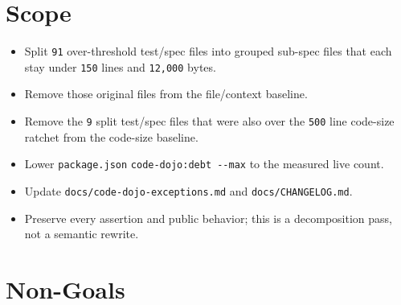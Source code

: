 \section{Scope}\label{record-243-scope}

\begin{itemize}
\tightlist
\item
  Split \texttt{9\allowbreak{}1} over-threshold test/spec files into grouped sub-spec files that each stay under \texttt{1\allowbreak{}5\allowbreak{}0} lines and \texttt{1\allowbreak{}2\allowbreak{},\allowbreak{}0\allowbreak{}0\allowbreak{}0} bytes.
\item
  Remove those original files from the file/context baseline.
\item
  Remove the \texttt{9} split test/spec files that were also over the \texttt{5\allowbreak{}0\allowbreak{}0} line code-size ratchet from the code-size baseline.
\item
  Lower \texttt{p\allowbreak{}a\allowbreak{}c\allowbreak{}k\allowbreak{}a\allowbreak{}g\allowbreak{}e\allowbreak{}.\allowbreak{}j\allowbreak{}s\allowbreak{}o\allowbreak{}n} \texttt{c\allowbreak{}o\allowbreak{}d\allowbreak{}e\allowbreak{}-\allowbreak{}d\allowbreak{}o\allowbreak{}j\allowbreak{}o\allowbreak{}:\allowbreak{}d\allowbreak{}e\allowbreak{}b\allowbreak{}t\allowbreak{} \allowbreak{}-\allowbreak{}-\allowbreak{}m\allowbreak{}a\allowbreak{}x} to the measured live count.
\item
  Update \texttt{d\allowbreak{}o\allowbreak{}c\allowbreak{}s\allowbreak{}/\allowbreak{}c\allowbreak{}o\allowbreak{}d\allowbreak{}e\allowbreak{}-\allowbreak{}d\allowbreak{}o\allowbreak{}j\allowbreak{}o\allowbreak{}-\allowbreak{}e\allowbreak{}x\allowbreak{}c\allowbreak{}e\allowbreak{}p\allowbreak{}t\allowbreak{}i\allowbreak{}o\allowbreak{}n\allowbreak{}s\allowbreak{}.\allowbreak{}m\allowbreak{}d} and \texttt{d\allowbreak{}o\allowbreak{}c\allowbreak{}s\allowbreak{}/\allowbreak{}C\allowbreak{}H\allowbreak{}A\allowbreak{}N\allowbreak{}G\allowbreak{}E\allowbreak{}L\allowbreak{}O\allowbreak{}G\allowbreak{}.\allowbreak{}m\allowbreak{}d}.
\item
  Preserve every assertion and public behavior; this is a decomposition pass, not a semantic rewrite.
\end{itemize}

\section{Non-Goals}\label{record-243-non-goals}

